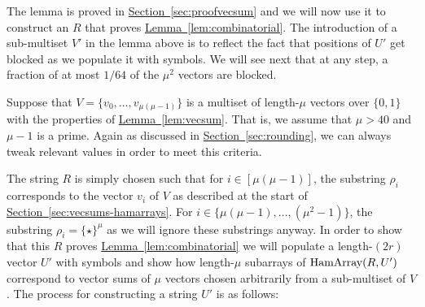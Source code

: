\documentclass[11pt]{article}
\numberwithin{equation}{section}
\theoremstyle{definition}
\theoremstyle{plain}
\newcommand{\expref}[2]{\hyperref[#2]{#1~\ref{#2}}}
\newcommand{\Hamarray}{\ensuremath{\textup{HamArray}}}
\newcommand{\ps}{\ensuremath{\rho}}
\newcommand{\psymb}{\ensuremath{\star}}
\begin{document}
The lemma is proved in \expref{Section}{sec:proofvecsum} and we will now use it to construct an $R$ that proves \expref{Lemma}{lem:combinatorial}. The introduction of a sub-multiset $V'$ in the lemma above is to reflect the fact that positions of $U'$ get blocked as we populate it with symbols. We will see next that at any step, a fraction of at most $1/64$ of the $\mu^2$ vectors are blocked.

Suppose that $V=\{v_0,\dots,v_{\mu(\mu-1)}\}$ is a multiset of
%
length-$\mu$  %
vectors over $\{0,1\}$ with the properties of \expref{Lemma}{lem:vecsum}. That is, we assume that $\mu>40$ and $\mu-1$ is a prime. Again as discussed in \expref{Section}{sec:rounding}, we can always tweak relevant values in order to meet this criteria.

The string $R$ is simply chosen such that for $i\in[\mu(\mu-1)]$, the substring $\ps_i$ corresponds to the vector $v_i$ of $V$ as described at the start of \expref{Section}{sec:vecsums-hamarrays}. For $i\in\{\mu(\mu-1),\dots,(\mu^2-1)\}$, the substring $\ps_i=\{\psymb\}^\mu$ as we will ignore these substrings anyway.
In order to show that this $R$ proves \expref{Lemma}{lem:combinatorial} we will populate a
%
length-$(2r)$  %
vector $U'$ with symbols and show how
%
length-$\mu$  %
subarrays of $\Hamarray(R,U')$ correspond to vector sums of $\mu$ vectors chosen arbitrarily from a sub-multiset of $V$. The process for constructing a string $U'$ is as follows:
\end{document}
